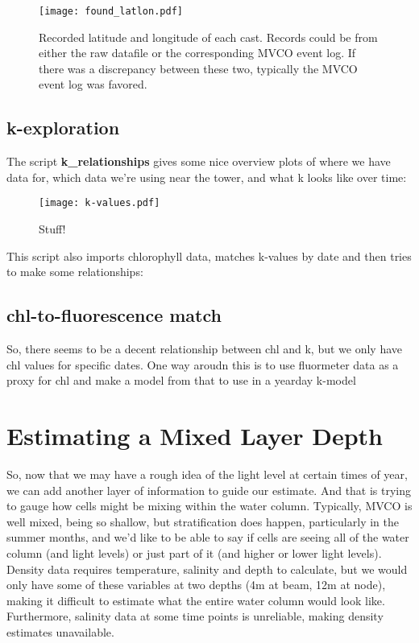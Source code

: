 \documentclass[11pt]{article}
\begin{document}
 \begin{figure}[h]
\centering
\texttt{[image: found\_latlon.pdf]}
\caption{Recorded latitude and longitude of each cast. Records could be from either the raw datafile or the corresponding MVCO event log. If there was a discrepancy between these two, typically the MVCO event log was favored.}
\end{figure}

\clearpage

\subsection{k-exploration}

The script \textbf{k\_relationships} gives some nice overview plots of where we have data for, which data we're using near the tower, and what k looks like over time:

 
 \begin{figure}[h]
\centering
\texttt{[image: k-values.pdf]}
\caption{Stuff!}
\end{figure}

This script also imports chlorophyll data, matches k-values by date and then tries to make some relationships:

\subsection{chl-to-fluorescence match}

So, there seems to be a decent relationship between chl and k, but we only have chl values for specific dates. One way aroudn this is to use fluormeter data as a proxy for chl and make a model from that to use in a yearday k-model


\section{Estimating a Mixed Layer Depth}

So, now that we may have a rough idea of the light level at certain times of year, we can add another layer of information to guide our estimate. And that is trying to gauge how cells might be mixing within the water column. Typically, MVCO is well mixed, being so shallow, but stratification does happen, particularly in the summer months, and we'd like to be able to say if cells are seeing all of the water column (and light levels) or just part of it (and higher or lower light levels). Density data requires temperature, salinity and depth to calculate, but we would only have some of these variables at two depths (4m at beam, 12m at node), making it difficult to estimate what the entire water column would look like. Furthermore, salinity data at some time points is unreliable, making density estimates unavailable.
\end{document}
